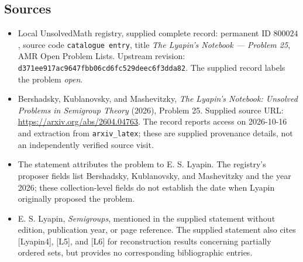 \documentclass[11pt]{article}
\begin{document}
\subsection{Sources}
\begin{itemize}
\item Local UnsolvedMath registry, supplied complete record: permanent ID \(800024\), source code \texttt{catalogue entry}, title \emph{The Lyapin's Notebook --- Problem 25}, AMR Open Problem Lists. Upstream revision: \texttt{d371ee917ac9647fbb06cd6fc529deec6f3dda82}. The supplied record labels the problem \emph{open}.
\item Bershadsky, Kublanovsky, and Mashevitzky, \emph{The Lyapin's Notebook: Unsolved Problems in Semigroup Theory} (2026), Problem 25. Supplied source URL: \url{https://arxiv.org/abs/2604.04763}. The record reports access on 2026-10-16 and extraction from \texttt{arxiv\_latex}; these are supplied provenance details, not an independently verified source visit.
\item The statement attributes the problem to E. S. Lyapin. The registry's proposer fields list Bershadsky, Kublanovsky, and Mashevitzky and the year 2026; these collection-level fields do not establish the date when Lyapin originally proposed the problem.
\item E. S. Lyapin, \emph{Semigroups}, mentioned in the supplied statement without edition, publication year, or page reference. The supplied statement also cites [Lyapin4], [L5], and [L6] for reconstruction results concerning partially ordered sets, but provides no corresponding bibliographic entries.
\end{itemize}
\end{document}

